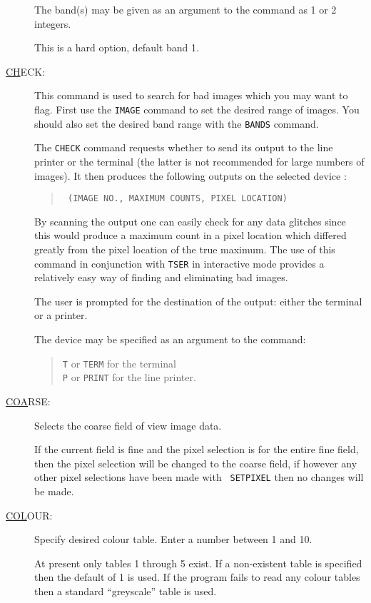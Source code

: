 \begin{description}
The band(s) may be given as an argument to the command as 1 or 2
integers.

This is a hard option, default band 1.

\item[\underline{CH}ECK: ] \label{ch}
This command is used to search for bad images which you may want to
flag. First use the {\tt IMAGE} command to set the desired range of
images. You should also set the desired band range with the {\tt BANDS}
command.

The {\tt CHECK} command requests whether to send its output to the line
printer or the terminal (the latter is not recommended for large
numbers of images). It then produces the following outputs on the
selected device :
\begin{quote}\tt
(IMAGE NO., MAXIMUM COUNTS, PIXEL LOCATION)
\end{quote}
By scanning the output one can easily check for any data glitches since
this would produce a maximum count in a pixel location which differed
greatly from the pixel location of the true maximum. The use of this
command in conjunction with {\tt TSER} in interactive mode provides a
relatively easy way of finding and eliminating bad images.

The user is prompted for the destination of the output: either the
terminal or a printer.

The device may be specified as an argument to the command:
\begin{quote}
{\tt T} or {\tt TERM} for the terminal\\ {\tt P} or {\tt PRINT} for the
line printer.
\end{quote}

\item[\underline{COA}RSE: ] \label{coa}
Selects the coarse field of view image data.
      
If the current field is fine and the pixel selection is for the entire
fine field, then the pixel selection will be changed to the coarse
field, if however any other pixel selections have been made with {\tt
SETPIXEL} then no changes will be made.

\item[\underline{COL}OUR: ] \label{col} 
Specify desired colour table. Enter a number between 1 and 10.

At present only tables 1 through 5 exist. If a non-existent table is
specified then the default of 1 is used. If the program fails to read
any colour tables then a standard ``greyscale'' table is used.


\end{description}
